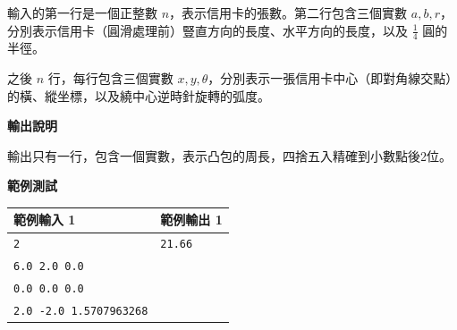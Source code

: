     輸入的第一行是一個正整數 $n$，表示信用卡的張數。第二行包含三個實數 $a, b, r$，分別表示信用卡（圓滑處理前）豎直方向的長度、水平方向的長度，以及 $\frac{1}{4}$ 圓的半徑。

    之後 $n$ 行，每行包含三個實數 $x, y, \theta$，分別表示一張信用卡中心（即對角線交點）的橫、縱坐標，以及繞中心逆時針旋轉的弧度。
    
    \textbf{輸出說明}

    輸出只有一行，包含一個實數，表示凸包的周長，四捨五入精確到小數點後2位。

    \textbf{範例測試}

    \begin{tabular}{|m{7cm}|m{7cm}|}
        \hline
        範例輸入 1 & 範例輸出 1 \\
        \hline
        \verb|2| & \verb|21.66| \\
        \verb|6.0 2.0 0.0| & \\
        \verb|0.0 0.0 0.0| & \\
        \verb|2.0 -2.0 1.5707963268| & \\
        \hline
    \end{tabular}

    